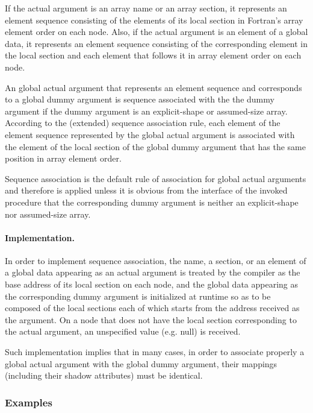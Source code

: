 If the actual argument is an array name or an array section,
it represents an element sequence consisting of the elements of its
local section in Fortran's array element order on each node.
%
Also, if the actual argument is an element of a global data, it
represents an element sequence consisting of the corresponding element
in the local section and each element that follows it in array element
order on each node.

An global actual argument that represents an element sequence and
corresponds to a global dummy argument is sequence associated with
the the dummy argument if the dummy argument is an explicit-shape or
assumed-size array.
%
According to the (extended) sequence association rule, each element of
the element sequence represented by the global actual argument is
associated with the element of the local section of the global dummy
argument that has the same position in array element order.

Sequence association is the default rule of association for global
actual arguments and therefore is applied unless it is obvious from the
interface of the invoked procedure that the corresponding dummy argument
is neither an explicit-shape nor assumed-size array.


\paragraph{Implementation.}

In order to implement sequence association, the name, a section, or an
element of a global data appearing as an actual argument is treated by
the {\XMP} compiler as the base address of its local section on each
node, and the global data appearing as the corresponding dummy argument
is initialized at runtime so as to be composed of the local sections
each of which starts from the address received as the argument.
%
On a node that does not have the local section corresponding to the
actual argument, an unspecified value (e.g. null) is received.

Such implementation implies that in many cases, in order to associate
properly a global actual argument with the global dummy argument, their
mappings (including their shadow attributes) must be identical.


\subsubsection*{Examples}


